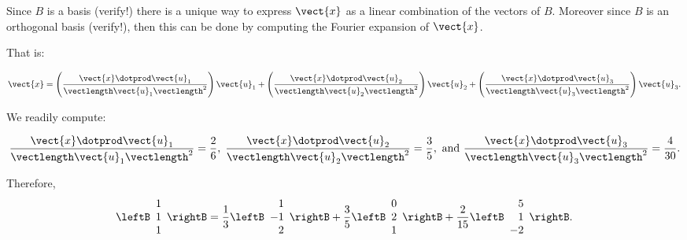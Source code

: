 \begin{solution}
Since $B$ is a basis (verify!) there is a unique way to express $\vect{x}$ as a
linear combination of the vectors of $B$. Moreover since $B$ is an
orthogonal basis (verify!), then this can be done by computing the
Fourier expansion of $\vect{x}$.

That is:

\[ 
\vect{x}   = 
\left(\frac{\vect{x}\dotprod \vect{u}_1}{\vectlength \vect{u}_1 \vectlength^2}\right) \vect{u}_1 +
\left(\frac{\vect{x}\dotprod \vect{u}_2}{\vectlength \vect{u}_2 \vectlength^2}\right) \vect{u}_2 +
\left(\frac{\vect{x}\dotprod \vect{u}_3}{\vectlength \vect{u}_3 \vectlength^2}\right) \vect{u}_3.
\]

We readily compute: 

\[
\frac{\vect{x}\dotprod\vect{u}_1}{\vectlength \vect{u}_1 \vectlength^2} = \frac{2}{6}, \; 
\frac{\vect{x}\dotprod\vect{u}_2}{\vectlength \vect{u}_2 \vectlength^2} = \frac{3}{5},
\mbox{ and }
\frac{\vect{x}\dotprod\vect{u}_3}{\vectlength \vect{u}_3 \vectlength^2} = \frac{4}{30}.\]

Therefore, 
\[ \leftB\begin{array}{r} 1 \\ 1 \\ 1 \end{array}\rightB
= \frac{1}{3}\leftB\begin{array}{r} 1 \\ -1 \\ 2 \end{array}\rightB
+\frac{3}{5}\leftB\begin{array}{r} 0 \\ 2 \\ 1  \end{array}\rightB
+\frac{2}{15}\leftB\begin{array}{r} 5 \\ 1 \\ -2 \end{array}\rightB.\]
\end{solution}

